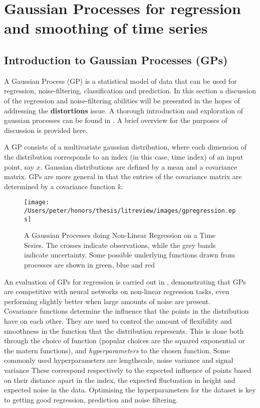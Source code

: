 	\section{Gaussian Processes for regression and smoothing of time series}
	\subsection{Introduction to Gaussian Processes (GPs)}
	A Gaussian Process (GP) is a statistical model of data that can be used for regression, noise-filtering, classification and prediction. In this section a discussion of the regression and noise-filtering abilities will be presented in the hopes of addressing the \textbf{distortions} issue. A thorough introduction and exploration of gaussian processes can be found in \citep{rasmussen2006gpfml}. A brief overview for the purposes of discussion is provided here.
	
	A GP consists of a multivariate gaussian distribution, where each dimension of the distribution corresponds to an index (in this case, time index) of an input point, say $x$. Gaussian distributions are defined by a mean and a covariance matrix. GPs are more general in that the entries of the covariance matrix are determined by a covariance function $k$. 
	\begin{figure}[ht!]
	\centering
	\texttt{[image: /Users/peter/honors/thesis/litreview/images/gpregression.eps]}
	\label{fig:gaussianprocessregression}
	\caption{A Gaussian Processes doing Non-Linear Regression on a Time Series. The crosses indicate observations, while the grey bands indicate uncertainty. Some possible underlying functions drawn from processes are shown in green, blue and red}
	\end{figure}
		An evaluation of GPs for regression is carried out in \citep{rasmussen1996evaluation}, demonstrating that GPs are competitive with neural networks on non-linear regression tasks, even performing slightly better when large amounts of noise are present.
	\\
	Covariance functions determine the influence that the points in the distribution have on each other. They are used to control the amount of flexibility and smoothness in the function that the distribution represents. This is done both through the choice of function (popular choices are the squared exponential or the matern functions), and \emph{hyperparameters} to the chosen function. Some commonly used hyperparameters are lengthscale, noise variance and signal variance These correspond respectively to the expected influence of points based on their distance apart in the index, the expected fluctuation in height and expected noise in the data. Optimising the hyperparameters for the dataset is key to getting good regression, prediction and noise filtering.

